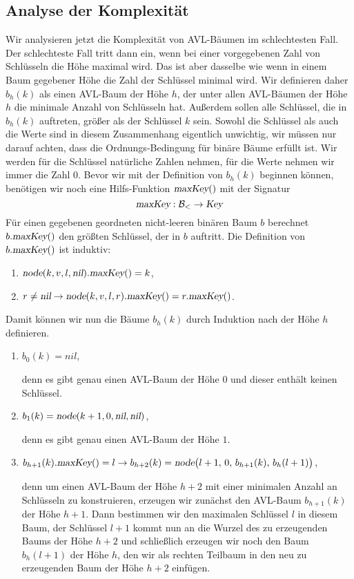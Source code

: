 \subsection{Analyse der Komplexit\"at}
Wir analysieren jetzt die Komplexit\"at von AVL-B\"aumen im schlechtesten Fall. Der
schlechteste Fall tritt dann ein, wenn bei einer vorgegebenen Zahl von Schl\"usseln die H\"ohe
maximal wird.  Das ist aber dasselbe wie wenn in einem Baum gegebener H\"ohe die Zahl der
Schl\"ussel minimal wird.  Wir definieren daher $b_h(k)$ als einen AVL-Baum der H\"ohe $h$, der
unter allen AVL-B\"aumen der H\"ohe $h$ die minimale Anzahl von Schl\"usseln hat.  Au{\ss}erdem
sollen alle Schl\"ussel, die in $b_h(k)$ auftreten, gr\"o{\ss}er als der Schl\"ussel $k$ sein.
Sowohl die Schl\"ussel als auch die Werte sind in diesem Zusammenhang eigentlich unwichtig,
wir m\"ussen nur darauf achten, dass die Ordnungs-Bedingung f\"ur bin\"are B\"aume erf\"ullt ist.
Wir werden f\"ur die Schl\"ussel nat\"urliche Zahlen nehmen, f\"ur die Werte nehmen wir immer die
Zahl $0$.  Bevor wir mit der Definition von $b_h(k)$ beginnen k\"onnen, ben\"otigen wir noch eine
Hilfs-Funktion $\textsl{maxKey}()$ mit der Signatur  
\[ \textsl{maxKey}:\mathcal{B}_< \rightarrow \textsl{Key} \]
F\"ur einen gegebenen geordneten nicht-leeren bin\"aren Baum $b$ 
berechnet $b.\textsl{maxKey}()$ den gr\"o{\ss}ten Schl\"ussel, der in $b$ auftritt.  Die
Definition von $b.\textsl{maxKey}()$ ist induktiv:
\begin{enumerate}
\item $\textsl{node}(k,v,l,\textsl{nil}).\textsl{maxKey}() = k$,
\item $r \not= \textsl{nil} \rightarrow \textsl{node}(k,v,l,r).\textsl{maxKey}() = r.\textsl{maxKey}()$.
\end{enumerate}
Damit k\"onnen wir nun die B\"aume $b_h(k)$ durch Induktion nach der H\"ohe $h$ definieren.
\begin{enumerate}
\item $b_0(k) = nil$,

      denn es gibt genau einen AVL-Baum der H\"ohe $0$ und dieser enth\"alt keinen Schl\"ussel.
\item $b_1(k) = \textsl{node}(k+1,0,\textsl{nil}, \textsl{nil})$,

      denn es gibt genau einen AVL-Baum der H\"ohe $1$.
\item $b_{h+1}(k).\textsl{maxKey}() = l \rightarrow 
       b_{h+2}(k) = \textsl{node}\bigl(l+1,\,0,\,b_{h+1}(k),\,b_h(l+1)\bigr)$,

      denn um einen AVL-Baum der H\"ohe $h+2$ mit einer minimalen Anzahl an Schl\"usseln zu
      konstruieren, erzeugen wir zun\"achst den AVL-Baum $b_{h+1}(k)$ der H\"ohe $h+1$.
      Dann bestimmen wir den maximalen Schl\"ussel $l$ in diesem Baum, der Schl\"ussel $l+1$
      kommt nun an die Wurzel des zu erzeugenden Baums der H\"ohe $h+2$ und schlie{\ss}lich erzeugen wir noch
      den Baum $b_h(l+1)$ der H\"ohe $h$, den wir als rechten Teilbaum in den neu zu
      erzeugenden Baum der H\"ohe $h+2$  einf\"ugen.
\end{enumerate}
